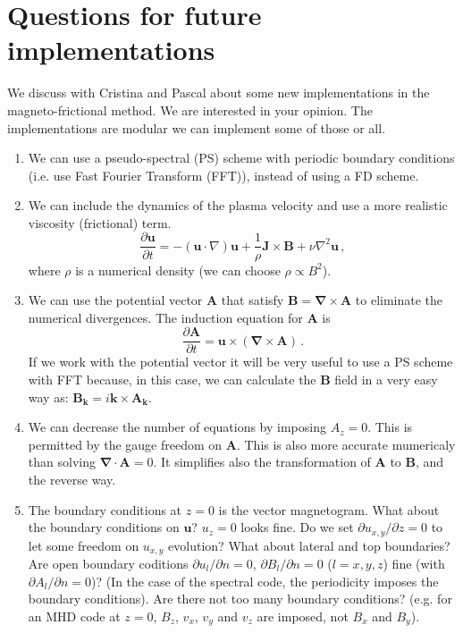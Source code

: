 \documentclass[a4paper,10pt]{article}
\def\bB{{\boldsymbol{B}}}
\def\bA{{\boldsymbol{A}}}
\def\bk{{\boldsymbol{k}}}
\def\bJ{{\boldsymbol{J}}}
\def\bu{{\boldsymbol{u}}}
\def\rot{\boldsymbol{\nabla \times}}
\def\div{\boldsymbol{\nabla \cdot}}
\def\dt#1{\frac{\partial #1}{\partial t}}
\begin{document}
\section{Questions for future implementations}

We discuss with Cristina and Pascal about some new implementations in the magneto-frictional method. We are interested in your opinion. The implementations are modular we can implement some of those or all.

\begin{enumerate}
 \item We can use a pseudo-spectral (PS) scheme with periodic boundary conditions (i.e. use Fast Fourier Transform (FFT)), instead of using a FD scheme.
 \item We can include the dynamics of the plasma velocity and use a more realistic viscosity (frictional) term.
 \begin{equation}
  \dt{\bu}=-(\bu \cdot \nabla)\bu+\frac{1}{\rho}{\bJ} \times {\bB} +\nu \nabla^2 \bu \,,
 \end{equation}
  where $\rho$ is a numerical density (we can choose $\rho \propto B^2$).
 \item We can use the potential vector $\bA$ that satisfy $\bB=\rot \bA$ to eliminate the numerical divergences. The induction equation for $\bA$ is
 \begin{equation}
  \dt{\bA}= \bu \times (\rot \bA) \,.
 \end{equation}
 If we work with the potential vector it will be very useful to use a PS scheme with FFT because, in this case, we can calculate the $\bB$ field in a very easy way as: $\bB_\bk= i \bk \times \bA_\bk$.
\item We can decrease the number of equations by imposing $A_z=0$. This is permitted by the gauge freedom on $\bA$. This is also more accurate mumericaly than solving $\div \bA=0$. It simplifies  also the transformation of $\bA$ to $\bB$, and the reverse way.

\item The boundary conditions at $z=0$ is the vector magnetogram. What about the boundary conditions on $\bu$? $u_z=0$ looks fine. Do we set $\partial u_{x,y} / \partial z=0$ to let some freedom on $u_{x,y}$ evolution? What about lateral and top boundaries? Are open boundary coditions $\partial u_{l}/ \partial n=0$,   $\partial B_{l}/ \partial n=0$ ($l=x,y,z$) fine (with $\partial A_{l}/ \partial n=0$)? (In the case of the spectral code, the periodicity imposes the boundary conditions). Are there not too many boundary conditions? (e.g. for an MHD code at $z=0$, $B_z$, $v_x$, $v_y$ and $v_z$ are imposed, not $B_x$ and $B_y$).
 \end{enumerate}
\end{document}
